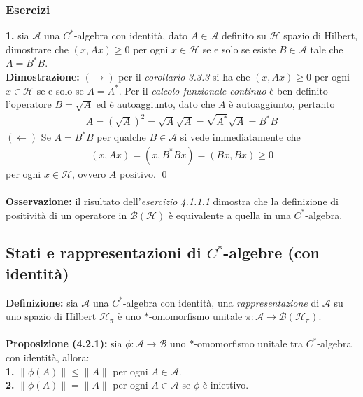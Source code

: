 \documentclass{article}
\numberwithin{equation}{subsection}
\begin{document}
\subsubsection{Esercizi}
\textbf{1.} sia $\mathscr{A}$ una $C^*$-algebra con identità, dato $A \in \mathscr{A}$ definito su $\mathcal{H}$ spazio di Hilbert, dimostrare che $(x, Ax) \geq 0$ per ogni $x \in \mathcal{H}$ se e solo se esiste $B \in \mathscr{A}$ tale che $A = B^*B$. \\

\textbf{Dimostrazione:} $(\rightarrow)$ per il \textit{corollario 3.3.3} si ha che $(x, Ax) \geq 0$ per ogni $x \in \mathcal{H}$ se e solo se $A = A^*$. Per il \textit{calcolo funzionale continuo} è ben definito l'operatore $B = \sqrt{A}$ ed è autoaggiunto, dato che $A$ è autoaggiunto, pertanto
\begin{align*}
    A = (\sqrt{A})^2 = \sqrt{A}\sqrt{A} = \sqrt{A^*}\sqrt{A} = B^*B
\end{align*}
$(\leftarrow)$ Se $A = B^*B$ per qualche $B \in \mathscr{A}$ si vede immediatamente che
\begin{align*}
    (x, Ax) = (x, B^*Bx) = (Bx, Bx) \geq 0
\end{align*}
per ogni $x \in \mathcal{H}$, ovvero $A$ positivo. \qed \\ \\
\textbf{Osservazione:} il risultato dell'\textit{esercizio 4.1.1.1} dimostra che la definizione di positività di un operatore in $\mathcal{B}(\mathcal{H})$ è equivalente a quella in una $C^*$-algebra.


\newpage
\subsection{Stati e rappresentazioni di $C^*$-algebre (con identità)}
\textbf{Definizione:} sia $\mathscr{A}$ una $C^*$-algebra con identità, una \textit{rappresentazione} di $\mathscr{A}$ su uno spazio di Hilbert $\mathcal{H}_\pi$ è uno $*$-omomorfismo unitale $\pi : \mathscr{A} \longrightarrow \mathcal{B}(\mathcal{H}_\pi)$. \\ \\
\textbf{Proposizione (4.2.1):} sia $\phi : \mathscr{A} \longrightarrow \mathscr{B}$ uno $*$-omomorfismo unitale tra $C^*$-algebra con identità, allora: \\
\textbf{1.} $\|\phi(A)\| \leq \|A\|$ per ogni $A \in \mathscr{A}$. \\
\textbf{2.} $\|\phi(A)\| = \|A\|$ per ogni $A \in \mathscr{A}$ se $\phi$ è iniettivo. \\
\end{document}

